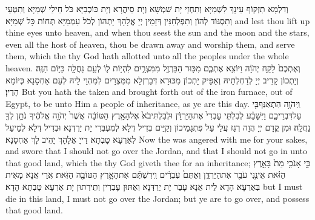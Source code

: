 {וְדִלְמָא תִזְקוֹף עֵינָךְ לִשְׁמַיָּא וְתִחְזֵי יָת שִׁמְשָׁא וְיָת סֵיהֲרָא וְיָת כּוֹכְבַיָּא כֹּל חֵילֵי שְׁמַיָּא וְתִטְעֵי וְתִסְגּוֹד לְהוֹן וְתִפְלְחִנִּין דְּזָמֵין יְיָ אֱלָהָךְ יָתְהוֹן לְכֹל עַמְמַיָּא תְּחוֹת כָּל שְׁמַיָּא׃}
{and lest thou lift up thine eyes unto heaven, and when thou seest the sun and the moon and the stars, even all the host of heaven, thou be drawn away and worship them, and serve them, which the \lord\space thy God hath allotted unto all the peoples under the whole heaven.}{}
{וְאֶתְכֶם֙ לָקַ֣ח יְהֹוָ֔ה וַיּוֹצִ֥א אֶתְכֶ֛ם מִכּ֥וּר הַבַּרְזֶ֖ל מִמִּצְרָ֑יִם לִהְי֥וֹת ל֛וֹ לְעַ֥ם נַחֲלָ֖ה כַּיּ֥וֹם הַזֶּֽה׃}
{וְיָתְכוֹן קָרֵיב יְיָ לְדַחְלְתֵיהּ וְאַפֵּיק יָתְכוֹן מִכּוּרָא דְּבַרְזְלָא מִמִּצְרָיִם לְמִהְוֵי לֵיהּ לְעַם אַחְסָנָא כְּיוֹמָא הָדֵין׃}
{But you hath the \lord\space taken and brought forth out of the iron furnace, out of Egypt, to be unto Him a people of inheritance, as ye are this day.}{}
{וַֽיהֹוָ֥ה הִתְאַנַּף\maqqaf בִּ֖י עַל\maqqaf דִּבְרֵיכֶ֑ם וַיִּשָּׁבַ֗ע לְבִלְתִּ֤י עׇבְרִי֙ אֶת\maqqaf הַיַּרְדֵּ֔ן וּלְבִלְתִּי\maqqaf בֹא֙ אֶל\maqqaf הָאָ֣רֶץ הַטּוֹבָ֔ה אֲשֶׁר֙ יְהֹוָ֣ה אֱלֹהֶ֔יךָ נֹתֵ֥ן לְךָ֖ נַחֲלָֽה׃}
{וּמִן קֳדָם יְיָ הֲוָה רְגַז עֲלַי עַל פִּתְגָמֵיכוֹן וְקַיֵּים בְּדִיל דְּלָא לְמִעְבְּרִי יָת יַרְדְּנָא וּבְדִיל דְּלָא לְמֵיעַל לְאַרְעָא טָבְתָא דַּייָ אֱלָהָךְ יָהֵיב לָךְ אַחְסָנָא׃}
{Now the \lord\space was angered with me for your sakes, and swore that I should not go over the Jordan, and that I should not go in unto that good land, which the \lord\space thy God giveth thee for an inheritance;}{}
{כִּ֣י אָנֹכִ֥י מֵת֙ בָּאָ֣רֶץ הַזֹּ֔את אֵינֶ֥נִּי עֹבֵ֖ר אֶת\maqqaf הַיַּרְדֵּ֑ן וְאַתֶּם֙ עֹֽבְרִ֔ים וִֽירִשְׁתֶּ֕ם אֶת\maqqaf הָאָ֥רֶץ הַטּוֹבָ֖ה הַזֹּֽאת׃}
{אֲרֵי אֲנָא מָאִית בְּאַרְעָא הָדָא לֵית אֲנָא עָבַר יָת יַרְדְּנָא וְאַתּוּן עָבְרִין וְתֵירְתוּן יָת אַרְעָא טָבְתָא הָדָא׃}
{but I must die in this land, I must not go over the Jordan; but ye are to go over, and possess that good land.}{}
